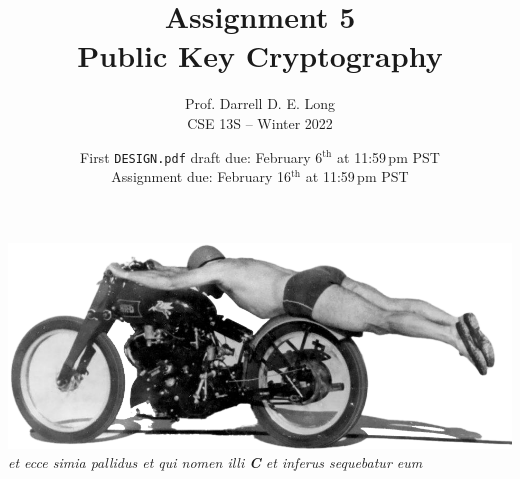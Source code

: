 \documentclass[11pt]{article}
\title{Assignment 5 \\ Public Key Cryptography}
\author{
  Prof.\xspace Darrell D.\xspace E.\xspace Long \\
  CSE 13S -- Winter 2022
}
\date{
  First \texttt{DESIGN.pdf} draft due: February 6$^\text{th}$ at 11:59\,pm PST \\
  Assignment due: February 16$^\text{th}$ at 11:59\,pm PST
}
\begin{document}
\maketitle






\label{numthm}








\vfill{}
\begin{center}
  \includegraphics[width=0.35\linewidth]{../../images/zoom-bike.png} \\
  \emph{et ecce simia pallidus et qui nomen illi \textbf{\textit{C}}  et inferus sequebatur eum}
\end{center}
\end{document}
